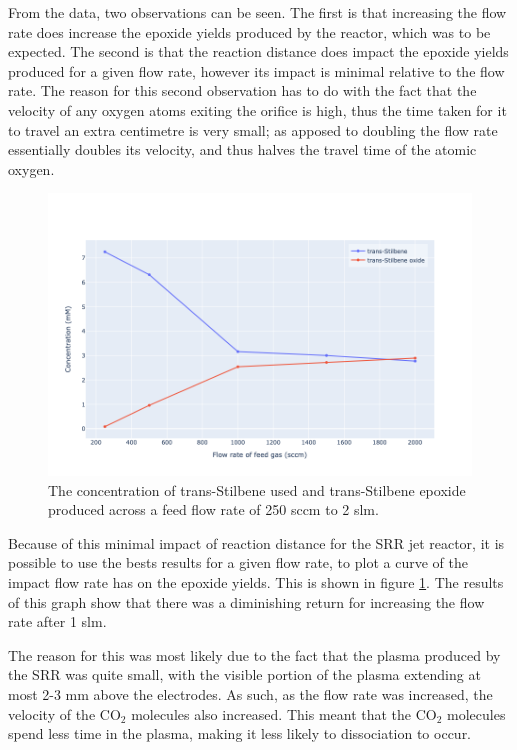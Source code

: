 From the data, two observations can be seen. The first is that increasing the flow rate does increase the epoxide yields produced by the reactor, which was to be expected. The second is that the reaction distance does impact the epoxide yields produced for a given flow rate, however its impact is minimal relative to the flow rate. The reason for this second observation has to do with the fact that the velocity of any oxygen atoms exiting the orifice is high, thus the time taken for it to travel an extra centimetre is very small; as apposed to doubling the flow rate essentially doubles its velocity, and thus halves the travel time of the atomic oxygen.

\begin{figure}[h!]
	\centering
    \includegraphics[width=\linewidth]{chapter_6/figures/flow_rate_ts_tse.png} 
	\caption{The concentration of trans-Stilbene used and trans-Stilbene epoxide produced across a feed flow rate of 250 sccm to 2 slm.}
	\label{fig:flow_rate_ts_tse}
\end{figure} 

Because of this minimal impact of reaction distance for the SRR jet reactor, it is possible to use the bests results for a given flow rate, to plot a curve of the impact flow rate has on the epoxide yields. This is shown in figure \ref{fig:flow_rate_ts_tse}. The results of this graph show that there was a diminishing return for increasing the flow rate after 1 slm.

The reason for this was most likely due to the fact that the plasma produced by the SRR was quite small, with the visible portion of the plasma extending at most 2-3 mm above the electrodes. As such, as the flow rate was increased, the velocity of the CO$_2$ molecules also increased. This meant that the CO$_2$ molecules spend less time in the plasma, making it less likely to dissociation to occur.

